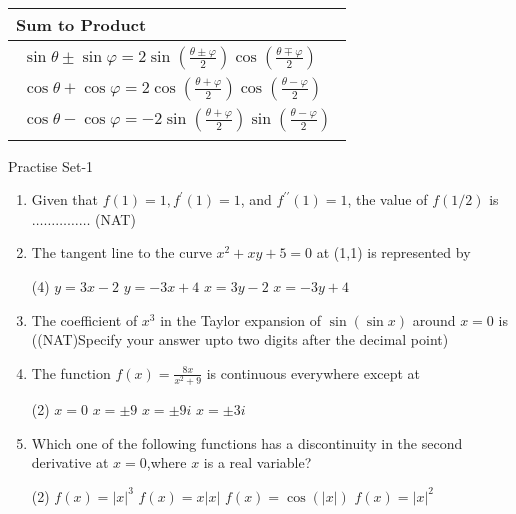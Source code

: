 \begin{minipage}{0.45\textwidth}
	\begin{table}[H]
		\centering
		\renewcommand{\arraystretch}{2.5}
		\begin{tabularx}{1\textwidth} { 
				| >{\centering\arraybackslash}X 
				|   }
			\hline
			\rowcolor{ocrel} \large \textbf{Sum to Product} \\
			\hline
			\hline
			$\begin{array}{l}
			\sin \theta \pm \sin \varphi=2 \sin \left(\frac{\theta \pm \varphi}{2}\right) \cos \left(\frac{\theta \mp \varphi}{2}\right) \\
			\cos \theta+\cos \varphi=2 \cos \left(\frac{\theta+\varphi}{2}\right) \cos \left(\frac{\theta-\varphi}{2}\right) \\
			\cos \theta-\cos \varphi=-2 \sin \left(\frac{\theta+\varphi}{2}\right) \sin \left(\frac{\theta-\varphi}{2}\right)
			\end{array}$\\ \hline
			
			
		\end{tabularx}
		
	\end{table}
	
\end{minipage}
\newpage
\begin{abox}
	Practise Set-1
\end{abox}
\begin{enumerate}
	\item Given that $f(1)=1, f^{\prime}(1)=1$, and $f^{\prime \prime}(1)=1$, the value of $f(1 / 2)$ is $\ldots \ldots \ldots \ldots \ldots$ (NAT){}

\item  The tangent line to the curve $x^{2}+x y+5=0$ at (1,1) is represented by 
{}
\begin{tasks}(4)
	\task[\textbf{a.}] $y=3 x-2$
	\task[\textbf{b.}]$y=-3 x+4$
	\task[\textbf{c.}] $x=3 y-2$
	\task[\textbf{d.}] $x=-3 y+4$
\end{tasks}

\item The coefficient of $x^{3}$ in the Taylor expansion of $\sin (\sin x)$ around $x=0$ is
((NAT)Specify your answer upto two digits after the decimal point){}
\item The function $f(x)=\frac{8 x}{x^{2}+9}$ is continuous everywhere except at
\begin{tasks}(2)
	\task[\textbf{a.}]  $x=0$ 
	\task[\textbf{b.}] $x=\pm 9$
	\task[\textbf{c.}] $x=\pm 9 i$
	\task[\textbf{d.}] $x=\pm 3 i$ 
\end{tasks}
\item Which one of the following functions has a discontinuity in the second derivative at $x=0$,where $x$ is a real variable?{}
\begin{tasks}(2)
	\task[\textbf{a.}] $f(x)=|x|^{3}$  
	\task[\textbf{b.}] $f(x)=x|x|$
	\task[\textbf{c.}] $f(x)=\cos (|x|)$
	\task[\textbf{d.}] $f(x)=|x|^{2}$
\end{tasks}
\end{enumerate}
